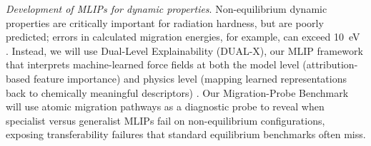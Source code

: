 \documentclass[pgs]{DOE}
\newcommand{\draft}[1]{{\color{TealBlue} #1}}
\begin{document}
\textit{Development of MLIPs for dynamic properties}.
Non-equilibrium dynamic properties are critically important for radiation hardness, but are poorly predicted; errors in calculated migration energies, for example, can exceed 10~eV \cite{cao2025what}.
Instead, we will use Dual-Level Explainability (DUAL-X), our MLIP framework that interprets machine-learned force fields at both the model level (attribution-based feature importance) and physics level (mapping learned representations back to chemically meaningful descriptors) \cite{cao2025what}.
Our Migration-Probe Benchmark will use atomic migration pathways as a diagnostic probe to reveal when specialist versus generalist MLIPs fail on non-equilibrium configurations, exposing transferability failures that standard equilibrium benchmarks often miss. 






%
\end{document}
